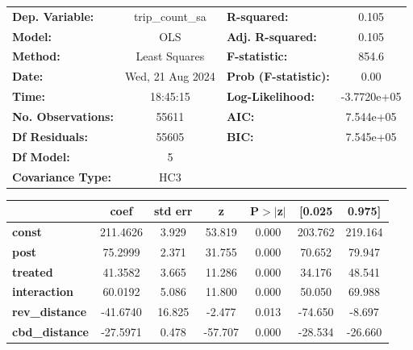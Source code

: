\begin{center}
\begin{tabular}{lclc}
\toprule
\textbf{Dep. Variable:}    & trip\_count\_sa  & \textbf{  R-squared:         } &      0.105   \\
\textbf{Model:}            &       OLS        & \textbf{  Adj. R-squared:    } &      0.105   \\
\textbf{Method:}           &  Least Squares   & \textbf{  F-statistic:       } &      854.6   \\
\textbf{Date:}             & Wed, 21 Aug 2024 & \textbf{  Prob (F-statistic):} &      0.00    \\
\textbf{Time:}             &     18:45:15     & \textbf{  Log-Likelihood:    } & -3.7720e+05  \\
\textbf{No. Observations:} &       55611      & \textbf{  AIC:               } &  7.544e+05   \\
\textbf{Df Residuals:}     &       55605      & \textbf{  BIC:               } &  7.545e+05   \\
\textbf{Df Model:}         &           5      & \textbf{                     } &              \\
\textbf{Covariance Type:}  &       HC3        & \textbf{                     } &              \\
\bottomrule
\end{tabular}
\begin{tabular}{lcccccc}
                       & \textbf{coef} & \textbf{std err} & \textbf{z} & \textbf{P$> |$z$|$} & \textbf{[0.025} & \textbf{0.975]}  \\
\midrule
\textbf{const}         &     211.4626  &        3.929     &    53.819  &         0.000        &      203.762    &      219.164     \\
\textbf{post}          &      75.2999  &        2.371     &    31.755  &         0.000        &       70.652    &       79.947     \\
\textbf{treated}       &      41.3582  &        3.665     &    11.286  &         0.000        &       34.176    &       48.541     \\
\textbf{interaction}   &      60.0192  &        5.086     &    11.800  &         0.000        &       50.050    &       69.988     \\
\textbf{rev\_distance} &     -41.6740  &       16.825     &    -2.477  &         0.013        &      -74.650    &       -8.697     \\
\textbf{cbd\_distance} &     -27.5971  &        0.478     &   -57.707  &         0.000        &      -28.534    &      -26.660     \\

\end{tabular}
\end{center}
